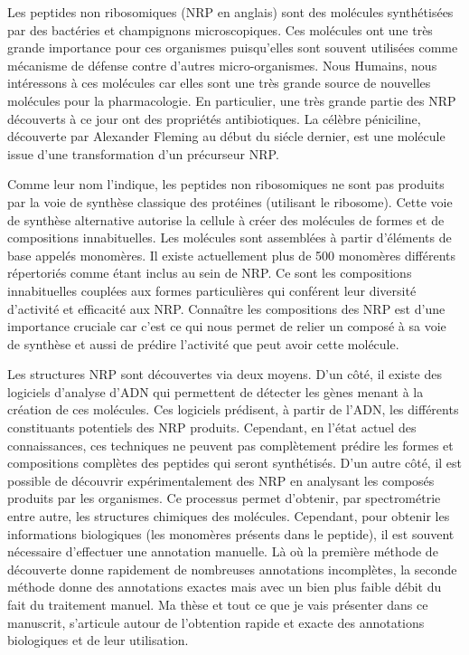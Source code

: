 Les peptides non ribosomiques (NRP en anglais) sont des molécules synthétisées par des bactéries et champignons microscopiques.
Ces molécules ont une très grande importance pour ces organismes puisqu'elles sont souvent utilisées comme mécanisme de défense contre d'autres micro-organismes.
Nous Humains, nous intéressons à ces molécules car elles sont une très grande source de nouvelles molécules pour la pharmacologie.
En particulier, une très grande partie des NRP découverts à ce jour ont des propriétés antibiotiques.
La célèbre péniciline, découverte par Alexander Fleming au début du siécle dernier, est une molécule issue d'une transformation d'un précurseur NRP.

Comme leur nom l'indique, les peptides non ribosomiques ne sont pas produits par la voie de synthèse classique des protéines (utilisant le ribosome).
Cette voie de synthèse alternative autorise la cellule à créer des molécules de formes et de compositions innabituelles.
Les molécules sont assemblées à partir d'éléments de base appelés monomères.
Il existe actuellement plus de 500 monomères différents répertoriés comme étant inclus au sein de NRP.
Ce sont les compositions innabituelles couplées aux formes particulières qui conférent leur diversité d'activité et efficacité aux NRP.
Connaître les compositions des NRP est d'une importance cruciale car c'est ce qui nous permet de relier un composé à sa voie de synthèse et aussi de prédire l'activité que peut avoir cette molécule.

Les structures NRP sont découvertes via deux moyens.
D'un côté, il existe des logiciels d'analyse d'ADN qui permettent de détecter les gènes menant à la création de ces molécules.
Ces logiciels prédisent, à partir de l'ADN, les différents constituants potentiels des NRP produits.
Cependant, en l'état actuel des connaissances, ces techniques ne peuvent pas complètement prédire les formes et compositions complètes des peptides qui seront synthétisés.
D'un autre côté, il est possible de découvrir expérimentalement des NRP en analysant les composés produits par les organismes.
Ce processus permet d'obtenir, par spectrométrie entre autre, les structures chimiques des molécules.
Cependant, pour obtenir les informations biologiques (les monomères présents dans le peptide), il est souvent nécessaire d'effectuer une annotation manuelle.
Là où la première méthode de découverte donne rapidement de nombreuses annotations incomplètes, la seconde méthode donne des annotations exactes mais avec un bien plus faible débit du fait du traitement manuel.
Ma thèse et tout ce que je vais présenter dans ce manuscrit, s'articule autour de l'obtention rapide et exacte des annotations biologiques et de leur utilisation.

